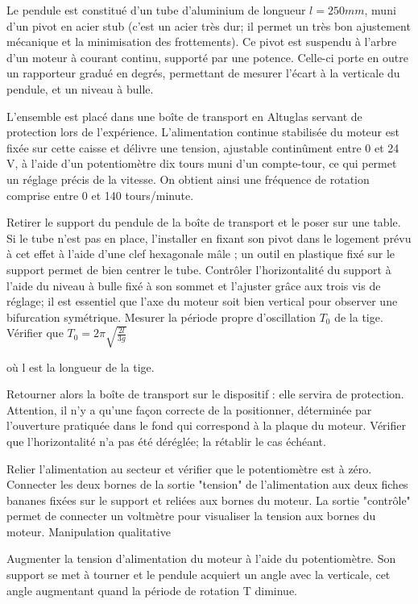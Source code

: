\documentclass{article}%
\begin{document}
Le pendule est constitué d'un tube d'aluminium de longueur $l=250 mm$, muni d'un pivot en acier stub (c'est un acier très dur; il permet un très bon ajustement mécanique et la minimisation des frottements). Ce pivot est suspendu à l'arbre d'un moteur à courant continu, supporté par une potence. Celle-ci porte en outre un rapporteur gradué en degrés, permettant de mesurer l'écart à la verticale du pendule, et un niveau à bulle.

L'ensemble est placé dans une boîte de transport en Altuglas servant de protection lors de l'expérience. L'alimentation continue stabilisée du moteur est fixée sur cette caisse et délivre une tension, ajustable continûment entre 0 et 24 V, à l'aide d'un potentiomètre dix tours muni d'un compte-tour, ce qui permet un réglage précis de la vitesse. On obtient ainsi une fréquence de rotation comprise entre 0 et 140 tours/minute.

Retirer le support du pendule de la boîte de transport et le poser sur une table. Si le tube n'est pas en place, l'installer en fixant son pivot dans le logement prévu à cet effet à l'aide d'une clef hexagonale mâle ; un outil en plastique fixé sur le support permet de bien centrer le tube. Contrôler l'horizontalité du support à l'aide du niveau à bulle fixé à son sommet et l'ajuster grâce aux trois vis de réglage; il est essentiel que l'axe du moteur soit bien vertical pour observer une bifurcation symétrique. Mesurer la période propre d'oscillation $T_0$ de la tige. Vérifier que
$T_0 = \displaystyle 2 \pi \sqrt{\frac{2l}{3g}}$

où l est la longueur de la tige.

Retourner alors la boîte de transport sur le dispositif : elle servira de protection. Attention, il n'y a qu'une façon correcte de la positionner, déterminée par l'ouverture pratiquée dans le fond qui correspond à la plaque du moteur. Vérifier que l'horizontalité n'a pas été déréglée; la rétablir le cas échéant.

Relier l'alimentation au secteur et vérifier que le potentiomètre est à zéro. Connecter les deux bornes de la sortie "tension" de l'alimentation aux deux fiches bananes fixées sur le support et reliées aux bornes du moteur. La sortie "contrôle" permet de connecter un voltmètre pour visualiser la tension aux bornes du moteur.
Manipulation qualitative

Augmenter la tension d'alimentation du moteur à l'aide du potentiomètre. Son support se met à tourner et le pendule acquiert un angle avec la verticale, cet angle augmentant quand la période de rotation T diminue.
\end{document}
